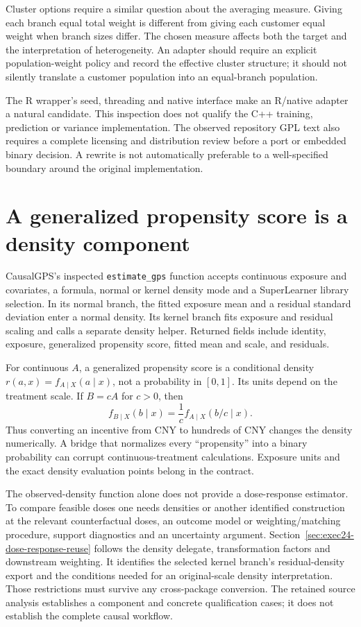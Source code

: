 Cluster options require a similar question about the averaging measure. Giving
each branch equal total weight is different from giving each customer equal
weight when branch sizes differ. The chosen measure affects both the target
and the interpretation of heterogeneity. An adapter should require an explicit
population-weight policy and record the effective cluster structure; it should
not silently translate a customer population into an equal-branch population.

The R wrapper's seed, threading and native interface make an R/native adapter
a natural candidate. This inspection does not qualify the C++ training,
prediction or variance implementation. The observed repository GPL text also
requires a complete licensing and distribution review before a port or embedded
binary decision. A rewrite is not automatically preferable to a well-specified
boundary around the original implementation. \citep{v13_sw_grf}

\section{A generalized propensity score is a density component}

CausalGPS's inspected \texttt{estimate\_gps} function accepts continuous
exposure and covariates, a formula, normal or kernel density mode and a
SuperLearner library selection. In its normal branch, the fitted exposure mean
and a residual standard deviation enter a normal density. Its kernel branch
fits exposure and residual scaling and calls a separate density helper. Returned
fields include identity, exposure, generalized propensity score, fitted mean
and scale, and residuals. \citep{v13_sw_causalgps}

For continuous $A$, a generalized propensity score is a conditional density
$r(a,x)=f_{A\mid X}(a\mid x)$, not a probability in $[0,1]$. Its units depend
on the treatment scale. If $B=cA$ for $c>0$, then
\[
 f_{B\mid X}(b\mid x)=\frac1c f_{A\mid X}(b/c\mid x).
\]
Thus converting an incentive from CNY to hundreds of CNY changes the density
numerically. A bridge that normalizes every ``propensity'' into a binary
probability can corrupt continuous-treatment calculations. Exposure units and
the exact density evaluation points belong in the contract.

The observed-density function alone does not provide a dose-response estimator.
To compare feasible doses one needs densities or another identified construction
at the relevant counterfactual doses, an outcome model or weighting/matching
procedure, support diagnostics and an uncertainty argument.
Section~\ref{sec:exec24-dose-response-reuse} follows the density delegate,
transformation factors and downstream weighting. It identifies the selected
kernel branch's residual-density export and the conditions needed for an
original-scale density interpretation. Those restrictions must survive any
cross-package conversion. The retained source analysis establishes a component
and concrete qualification cases; it does not establish the complete causal
workflow.

